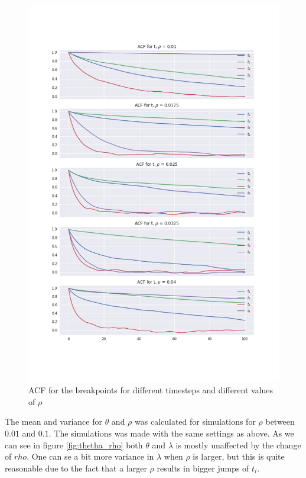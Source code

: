 \documentclass[a4paper]{article}
\begin{document}
\begin{figure}[H]
    \centering
    \includegraphics[width = 1.0\textwidth]{images/ACF.png} 
    \caption{ACF for the breakpoints for different timesteps and different values of $\rho$}
    \label{fig:acf}
\end{figure}

The mean and variance for $\theta$ and $\rho$ was calculated for simulations for $\rho$ between $0.01$ and $0.1$. The simulations was made with the same settings as above. As we can see in figure \ref{fig:thetha_rho} both $\theta$ and $\lambda$ is mostly unaffected by the change of $rho$. One can se a bit more variance in $\lambda$ when $\rho$ is larger, but this is quite reasonable due to the fact that a larger $\rho$ results in bigger jumps of $t_i$.
\end{document}
